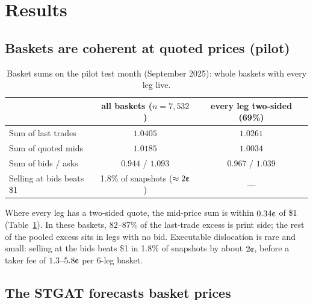 \documentclass[11pt,a4paper]{article}
\newcommand{\cent}{\text{\textcent}}
\begin{document}
\section{Results}

\subsection{Baskets are coherent at quoted prices (pilot)}\label{sec:res-coherence}

\begin{table}[htbp]
\centering
\caption{Basket sums on the pilot test month (September 2025): whole baskets with every leg live.}
\label{tab:coherence}
\begin{tabular}{lcc}
\toprule
 & all baskets ($n=7{,}532$) & every leg two-sided (69\%) \\
\midrule
Sum of last trades & $1.0405$ & $1.0261$ \\
Sum of quoted mids & $1.0185$ & $\bm{1.0034}$ \\
Sum of bids / asks & $0.944$ / $1.093$ & $0.967$ / $1.039$ \\
Selling at bids beats \$1 & 1.8\% of snapshots ($\approx 2\cent$) & --- \\
\bottomrule
\end{tabular}
\end{table}

Where every leg has a two-sided quote, the mid-price sum is within $0.34\cent$ of \$1 (Table~\ref{tab:coherence}).
In these baskets, 82--87\% of the last-trade excess is print side; the rest of the pooled excess sits in legs with no
bid. Executable dislocation is rare and small: selling at the bids beats \$1 in 1.8\% of snapshots by about
$2\cent$, before a taker fee of $1.3$--$5.8\cent$ per 6-leg basket.

\subsection{The STGAT forecasts basket prices}\label{sec:res-forecast}
\end{document}
